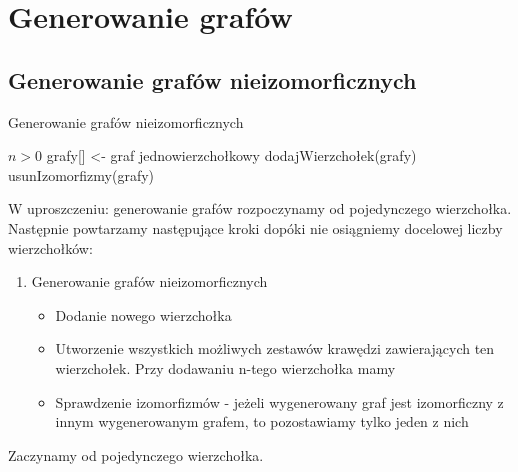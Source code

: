 \section{Generowanie grafów}

\subsection{Generowanie grafów nieizomorficznych} 

\begin{algorithm}
  \caption{Generowanie grafów nieizomorficznych}
  \begin{algorithmic}
  \REQUIRE $n > 0 $
  \STATE grafy[] <- graf jednowierzchołkowy 
    \STATE dodajWierzchołek(grafy)
    \STATE usunIzomorfizmy(grafy)
  \ENDWHILE
  \end{algorithmic}
\end{algorithm}

W uproszczeniu: generowanie grafów rozpoczynamy od pojedynczego wierzchołka.
Następnie powtarzamy następujące kroki dopóki nie osiągniemy docelowej liczby wierzchołków:
\begin{enumerate}
 \item Generowanie grafów nieizomorficznych 

 \begin{itemize}
 \item  Dodanie nowego wierzchołka  

 \item Utworzenie wszystkich możliwych zestawów krawędzi zawierających ten wierzchołek. Przy dodawaniu n-tego wierzchołka mamy 

 \item Sprawdzenie izomorfizmów - jeżeli wygenerowany graf jest izomorficzny z innym wygenerowanym grafem, to pozostawiamy tylko jeden z nich 
 
 \end{itemize}
\end{enumerate}

Zaczynamy od pojedynczego wierzchołka.

\begin{figure}[H]
  \centering
   \caption{}
\end{figure}

\begin{figure}[h]
  \centering
   \caption{}
\end{figure}

